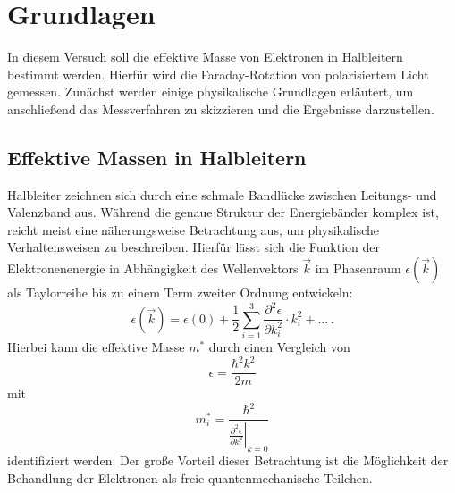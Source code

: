 \section{Grundlagen} %
\label{sec:grundlagen}
In diesem Versuch soll die effektive Masse von Elektronen in Halbleitern
bestimmt werden.
Hierfür wird die Faraday-Rotation von polarisiertem Licht gemessen.
Zunächst werden einige physikalische Grundlagen erläutert, um anschließend
das Messverfahren zu skizzieren und die Ergebnisse darzustellen.

\subsection{Effektive Massen in Halbleitern} %
\label{sub:effektive_masse}
Halbleiter zeichnen sich durch eine schmale Bandlücke zwischen Leitungs-
und Valenzband aus.
Während die genaue Struktur der Energiebänder komplex ist, reicht meist
eine näherungsweise Betrachtung aus, um physikalische Verhaltensweisen zu
beschreiben.
Hierfür lässt sich die Funktion der Elektronenenergie in Abhängigkeit des
Wellenvektors $\vec{k}$
im Phasenraum $\epsilon(\vec{k})$ als Taylorreihe bis zu einem Term zweiter
Ordnung entwickeln:
\begin{equation}
    \label{eqn:energie}
    \epsilon\left(\vec{k}\right) = \epsilon(0) + \frac{1}{2}\sum_{i=1}^{3}\frac{\partial^2\epsilon}{\partial k_i^2}\cdot k_i^2 + \dots\,.
\end{equation}
Hierbei kann die effektive Masse $m^*$ durch einen Vergleich von
\begin{equation*}
    \epsilon = \frac{\hbar^2 k^2}{2m}
\end{equation*}
mit
\begin{equation}
    m_i^* = \frac{\hbar^2}{\left.\frac{\partial^2\epsilon}{\partial k_i^2}\right|_{k=0}}
\end{equation}
identifiziert werden. Der große Vorteil dieser Betrachtung ist die
Möglichkeit der Behandlung der Elektronen als freie quantenmechanische
Teilchen.
